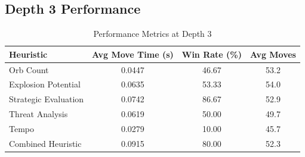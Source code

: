 \documentclass[12pt]{article}
\begin{document}
\subsection{Depth 3 Performance}
\begin{table}[ht]
  \centering
  \caption{Performance Metrics at Depth 3}
  \label{tab:metrics_depth3}
  \begin{tabular}{lccc}
    \toprule
    Heuristic                & Avg Move Time (s) & Win Rate (\%) & Avg Moves \\
    \midrule
    Orb Count                & 0.0447            & 46.67         & 53.2      \\
    Explosion Potential      & 0.0635            & 53.33         & 54.0      \\
    Strategic Evaluation     & 0.0742            & 86.67         & 52.9      \\
    Threat Analysis          & 0.0619            & 50.00         & 49.7      \\
    Tempo                    & 0.0279            & 10.00         & 45.7      \\
    Combined Heuristic       & 0.0915            & 80.00         & 52.3      \\
    \bottomrule
  \end{tabular}
\end{table}
\end{document}
